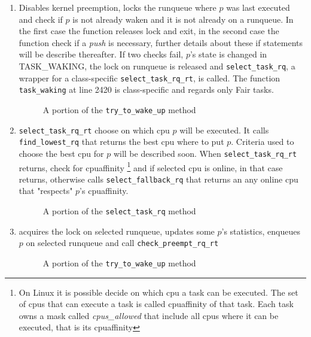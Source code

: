 \begin{enumerate}
\item Disables kernel preemption, locks the runqueue where $p$ was last executed and check 
if $p$ is not already waken and it is not already on a runqueue. In the first case the 
function releases lock and exit, in the second case the function check if a
\textit{push} is necessary, further details about these if statements will be
describe thereafter. If two checks fail, $p$'s state is changed in TASK\_WAKING, the
lock on runqueue is released and \texttt{select\_task\_rq}, a wrapper for a 
class-specific \texttt{select\_task\_rq\_rt}, is called. The function 
\texttt{task\_waking} at line 2420 is class-specific and regards only Fair tasks.

\begin{figure}[h]
  \lstset{basicstyle=\footnotesize, language=c, captionpos=b, frame=single,label=lis:steps}
  
  \label{code:steps_ttwu}
  \caption{A portion of the \texttt{try\_to\_wake\_up} method}
\end{figure}

\item \texttt{select\_task\_rq\_rt} choose on which cpu $p$ will be executed. It
calls \texttt{find\_lowest\_rq} that returns the best cpu where to put $p$. Criteria
used to choose the best cpu for $p$ will be described soon. When \texttt{select\_task\_rq\_rt} 
returns, check for cpuaffinity \footnote{On Linux it is possible decide on which
cpu a task can be executed. The set of cpus that can execute a task is called 
cpuaffinity of that task. Each task owns a mask called \textit{cpus\_allowed} 
that include all cpus where it can be executed, that is its cpuaffinity} and 
if selected cpu is online, in that case returns, otherwise calls 
\texttt{select\_fallback\_rq} that returns an any online cpu that "respects" 
$p$'s cpuaffinity.

\begin{figure}[h]
  \lstset{basicstyle=\footnotesize, language=c, captionpos=b, frame=single,label=lis:steps}
  
  \label{code:select_task}
  \caption{A portion of the \texttt{select\_task\_rq} method}
\end{figure}

\item acquires the lock on selected runqueue, updates some $p$'s statistics, enqueues 
$p$ on selected runqueue and call \texttt{check\_preempt\_rq\_rt} 

\begin{figure}[h]
  \lstset{basicstyle=\footnotesize, language=c, captionpos=b, frame=single,label=lis:steps}
  
  \label{code:check_preempt}
  \caption{A portion of the \texttt{try\_to\_wake\_up} method}
\end{figure}


\end{enumerate}
